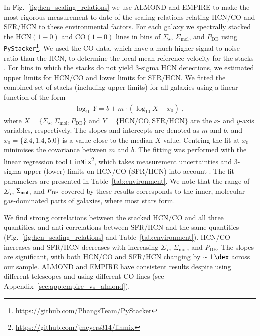 \documentclass[letter, longauth]{aa} %
\newcommand*{\hcnone}{\ensuremath{\mathrm{HCN(1-0)}}\xspace} %
\newcommand*{\coone}{\ensuremath{\mathrm{CO(1-0)}}\xspace} %
\newcommand*{\sigmol}{\ensuremath{\Sigma_{\text{mol}}}\xspace}  %
\newcommand*{\pde}{\ensuremath{P_{\text{DE}}}\xspace}  %
\newcommand*{\sigstar}{\ensuremath{\Sigma_{\star}}\xspace}  %
\begin{document}
In Fig.~\ref{fig:hcn_scaling_relations} we use ALMOND and EMPIRE to make the most rigorous measurement to date of the scaling relations relating HCN/CO and SFR/HCN to these environmental factors. For each galaxy we spectrally stacked the \hcnone and \coone lines in bins of \sigstar, \sigmol, and \pde using \texttt{PyStacker}\footnote{\url{https://github.com/PhangsTeam/PyStacker}}. We used the CO data, which have a much higher signal-to-noise ratio than the HCN, to determine the local mean reference velocity for the stacks \citep[see][and references therein for details on the spectral stacking methodology; Appendix~\ref{sec:app:stacking} presents the spectral stacks of HCN and CO]{Neumann2023b}. 
For bins in which the stacks do not yield 3-sigma HCN detections, we estimated upper limits for HCN/CO and lower limits for SFR/HCN. 
We fitted the combined set of stacks (including upper limits) for all galaxies using a linear function of the form
\begin{align}
        \log_{10} Y = b + m \cdot (\log_{10} X - x_0)\;,
    \label{equ:fit_function}
\end{align}
where $X=\{\sigstar, \sigmol, \pde\}$ and $Y=\{\mathrm{HCN/CO}, \mathrm{SFR/HCN}\}$ are the $x$- and $y$-axis variables, respectively. 
The slopes and intercepts are denoted as $m$ and $b$, and $x_0=\{2.4, 1.4, 5.0\}$ is a value close to the median $X$ value. 
Centring the fit at $x_0$ minimises the covariance between $m$ and $b$. The fitting was performed with the linear regression tool \texttt{LinMix}\footnote{\url{https://github.com/jmeyers314/linmix}}, which takes measurement uncertainties and 3-sigma upper (lower) limits on HCN/CO (SFR/HCN) into account \citep[see e.g.][for more details on the fitting routine]{Neumann2023a}.
The fit parameters are presented in Table~\ref{tab:environment}. We note that the range of $\Sigma_\star$, $\Sigma_{\rm mol}$, and $P_{\rm DE}$ covered by these results corresponds to the inner, molecular-gas-dominated parts of galaxies, where most stars form.

We find strong correlations between the stacked HCN/CO and all three quantities, and anti-correlations between SFR/HCN and the same quantities (Fig.~\ref{fig:hcn_scaling_relations} and Table~\ref{tab:environment}). 
HCN/CO increases and SFR/HCN decreases with increasing \sigstar, \sigmol, and \pde. 
The slopes are significant, with both HCN/CO and SFR/HCN changing by $\sim\SI{1}{\dex}$ across our sample. 
ALMOND and EMPIRE have consistent results despite using different telescopes and using different CO lines (see Appendix~\ref{sec:app:empire_vs_almond}).
\end{document}
